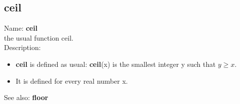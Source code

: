 \subsection{ ceil }
\noindent Name: \textbf{ceil}\\
the usual function ceil.\\

\noindent Description: \begin{itemize}

\item \textbf{ceil} is defined as usual: \textbf{ceil}(x) is the smallest integer y such that $y \ge x$.

\item It is defined for every real number x.
\end{itemize}
See also: \textbf{floor}
